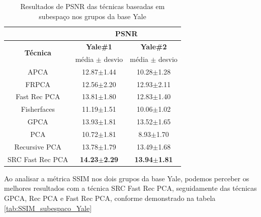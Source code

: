 \begin{table}[H]
\caption{Resultados de PSNR das técnicas baseadas em subespaço nos grupos da base Yale}
\centering
\begin{tabular}{|c|c|c|}
\cline{2-3}
 \multicolumn{1}{c|}{} & \multicolumn{2}{c|}{\textbf{PSNR}}\\ \hline
\multicolumn{1}{|c|}{\multirow{2}{*}{\textbf{Técnica} }}& \textbf{Yale\#1} &  \textbf{Yale\#2}   \\ \cline{2-3}

& média $\pm$ desvio & média $\pm$ desvio \\\hline 
APCA&	        12.87$\pm$1.44&	10.28$\pm$1.28\\\hline
FRPCA&	        12.56$\pm$2.20&	12.93$\pm$2.11\\\hline
Fast Rec PCA&	13.81$\pm$1.80&	12.83$\pm$1.40\\\hline
Fisherfaces&	11.19$\pm$1.51&	10.06$\pm$1.02\\\hline
GPCA&       	13.93$\pm$1.81&	13.52$\pm$1.65\\\hline
PCA&            10.72$\pm$1.81&	8.93$\pm$1.70\\\hline
Recursive PCA&	13.78$\pm$1.79&	13.49$\pm$1.68\\\hline
SRC Fast Rec PCA&	\textbf{14.23$\pm$2.29}&	\textbf{13.94$\pm$1.81}\\\hline
\end{tabular}
\label{tab:PSNR_subespaco_Yale}
\end{table}

Ao analisar a métrica SSIM nos dois grupos da base Yale, podemos perceber os melhores resultados com a técnica SRC Fast Rec PCA, seguidamente das técnicas GPCA, Rec PCA e Fast Rec PCA, conforme demonstrado na tabela \ref{tab:SSIM_subespaco_Yale}


